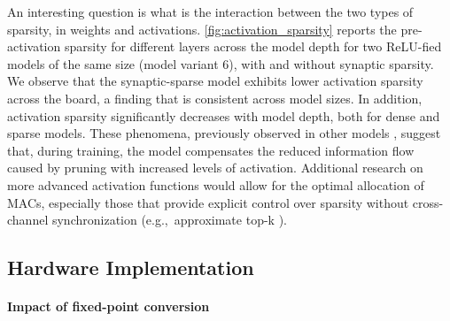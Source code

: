 An interesting question is what is the interaction between the two types of sparsity, in weights and activations.
\autoref{fig:activation_sparsity} reports the pre-activation sparsity for different layers across the model depth for two ReLU-fied models of the same size (model variant \qty{6}{}), with and without synaptic sparsity.
%
We observe that the synaptic-sparse model exhibits lower activation sparsity across the board, a finding that is consistent across model sizes.
%
In addition, activation sparsity significantly decreases with model depth, both for dense and sparse models.
These phenomena, previously observed in other models \cite{mukherji2024weight}, suggest that, during training, the model compensates the reduced information flow caused by pruning with increased levels of activation.
Additional research on more advanced activation functions would allow for the optimal allocation of MACs, especially those that provide explicit control over sparsity without cross-channel synchronization (e.g.,\ approximate top-k \cite{DBLP:journals/corr/abs-2412-04358}).






\subsection{Hardware Implementation} 
\label{ss:hardware-implementation}




\paragraph{Impact of fixed-point conversion}


